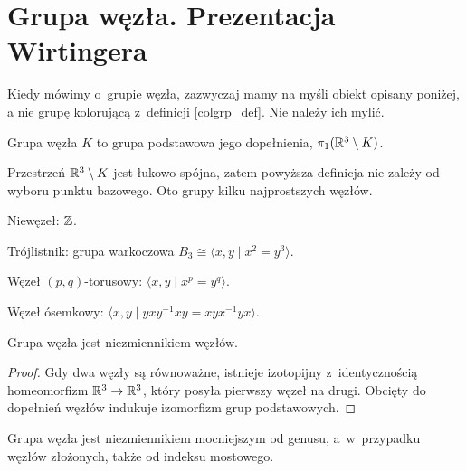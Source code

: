 \section{Grupa węzła. Prezentacja Wirtingera} %
\label{sec:group_wirtinger}
Kiedy mówimy o~grupie węzła,
zazwyczaj mamy na myśli obiekt opisany poniżej,
a nie grupę kolorującą z~definicji \ref{colgrp_def}.
Nie należy ich mylić.

\begin{definition}
    \label{def:knot_group}
    Grupa węzła $K$ to grupa podstawowa jego dopełnienia, $\pi_1(\mathbb R^3 \setminus K)$.
\end{definition}

Przestrzeń $\mathbb R^3 \setminus K$ jest łukowo spójna,
zatem powyższa definicja nie zależy od wyboru punktu bazowego.
Oto grupy kilku najprostszych węzłów.

\begin{example}
    Niewęzeł: $\mathbb Z$.
\end{example}

\begin{example}
    Trójlistnik: grupa warkoczowa $B_3 \cong \langle x, y \mid x^2 = y^3\rangle$.
\end{example}

\begin{example}
    Węzeł $(p,q)$-torusowy: $\langle x, y \mid x^p = y^q \rangle$.
\end{example}

\begin{example}
    Węzeł ósemkowy: $\langle x, y \mid yxy^{{-1}}xy=xyx^{{-1}}yx \rangle$.
\end{example}

\begin{proposition}
    \label{prop:knot_group_invariant}
    Grupa węzła jest niezmiennikiem węzłów.
\end{proposition}

\begin{proof}
    Gdy dwa węzły są równoważne,
    istnieje izotopijny z~identycznością homeomorfizm $\mathbb R^3 \to \mathbb R^3$,
    który posyła pierwszy węzeł na drugi.
    Obcięty do dopełnień węzłów indukuje izomorfizm grup podstawowych.
\end{proof}

\begin{proposition}
    Grupa węzła jest niezmiennikiem mocniejszym od genusu, a~w~przypadku węzłów złożonych, także od indeksu mostowego.
\end{proposition}

